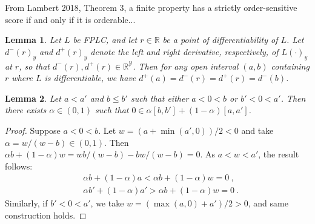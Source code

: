 \documentclass[11pt]{article}
\newcommand{\reals}{\mathbb{R}}
\newcommand{\Y}{\mathcal{Y}}
\newtheorem{lemma}{Lemma}
\begin{document}
From Lambert 2018, Theorem 3, a finite property has a strictly order-sensitive score if and only if it is orderable...

\begin{lemma}\label{lem:fplc-directional-deriv}
  Let $L$ be FPLC, and let $r\in\reals$ be a point of differentiability of $L$.
  Let $d^-(r)_y$ and $d^+(r)_y$ denote the left and right derivative, respectively, of $L(\cdot)_y$ at $r$, so that $d^-(r),d^+(r)\in\reals^\Y$.
  Then for any open interval $(a,b)$ containing $r$ where $L$ is differentiable, we have
$d^+(a) = d^-(r) = d^+(r) = d^-(b)$.
\end{lemma}

\begin{lemma}\label{lem:simple-intervals}
  Let $a<a'$ and $b\leq b'$ such that either $a< 0 < b$ or $b' < 0 < a'$.
  Then there exists $\alpha \in (0,1)$ such that $0 \in \alpha [b,b'] + (1-\alpha) [a,a']$.
\end{lemma}
\begin{proof}
  Suppose $a < 0 < b$.
  Let $w = (a + \min(a',0))/2 < 0$ and take $\alpha = w/(w-b) \in (0,1)$.
  Then $\alpha b + (1-\alpha) w = wb/(w-b) - bw/(w-b) = 0$.
  As $a < w < a'$, the result follows:
  \begin{align*}
    & \alpha b + (1-\alpha) a < \alpha b + (1-\alpha) w = 0~,
    \\
    & \alpha b' + (1-\alpha) a' > \alpha b + (1-\alpha) w = 0~.
  \end{align*}
  Similarly, if $b' < 0 < a'$, we take $w = (\max(a,0)+a')/2 > 0$, and same construction holds.
\end{proof}
\end{document}
